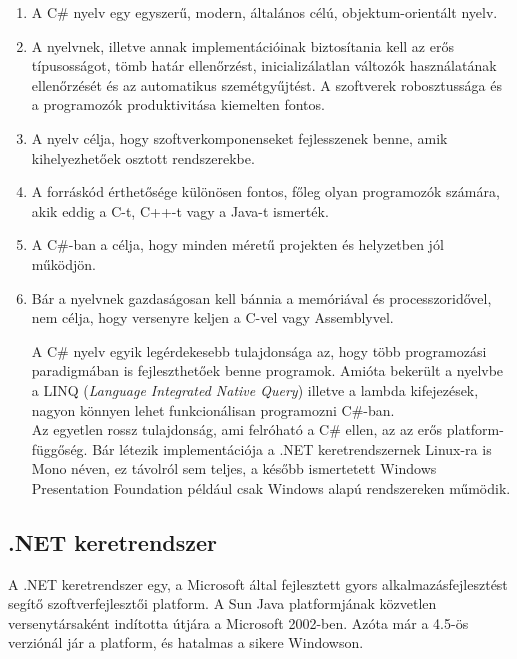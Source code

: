 \documentclass[a4paper,12pt]{report}
\begin{document}
\begin{enumerate}

\item A C\# nyelv\cite{csharp} egy egyszerű, modern, általános célú, objektum-orientált nyelv.
\item A nyelvnek, illetve annak implementációinak biztosítania kell az erős típusosságot, tömb határ ellenőrzést, inicializálatlan változók használatának ellenőrzését és az automatikus szemétgyűjtést. A szoftverek robosztussága és a programozók produktivitása kiemelten fontos.
\item A nyelv célja, hogy szoftverkomponenseket fejlesszenek benne, amik kihelyezhetőek osztott rendszerekbe.
\item A forráskód érthetősége különösen fontos, főleg olyan programozók számára, akik eddig a C-t, C++-t vagy a Java-t ismerték.
\item A C\#-ban a célja, hogy minden méretű projekten és helyzetben jól működjön.
\item Bár a nyelvnek gazdaságosan kell bánnia a memóriával és processzoridővel, nem célja, hogy versenyre keljen a C-vel vagy Assemblyvel.

A C\# nyelv egyik legérdekesebb tulajdonsága az, hogy több programozási paradigmában is fejleszthetőek benne programok. Amióta bekerült a nyelvbe a LINQ (\textit{Language Integrated Native Query})\cite{linq} illetve a lambda kifejezések, nagyon könnyen lehet funkcionálisan programozni C\#-ban. \\

Az egyetlen rossz tulajdonság, ami felróható a C\# ellen, az az erős platform-függőség. Bár létezik implementációja a .NET keretrendszernek Linux-ra is Mono néven, ez távolról sem teljes, a később ismertetett Windows Presentation Foundation például csak Windows alapú rendszereken műmödik.

\end{enumerate}



\subsection{.NET keretrendszer}

A .NET keretrendszer\cite{dotnet} egy, a Microsoft által fejlesztett gyors alkalmazásfejlesztést segítő szoftverfejlesztői platform. A Sun Java platformjának közvetlen versenytársaként indította útjára a Microsoft 2002-ben. Azóta már a 4.5-ös verziónál jár a platform, és hatalmas a sikere Windowson. 
\end{document}
